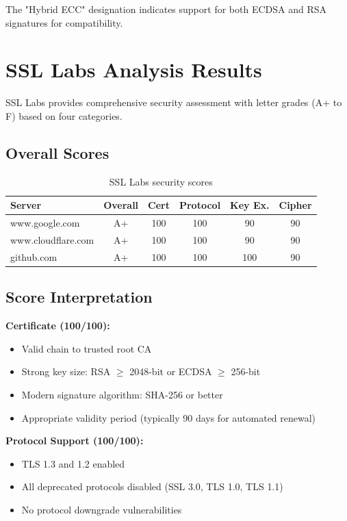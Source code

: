 \documentclass[12pt,a4paper]{article}
\begin{document}
The "Hybrid ECC" designation indicates support for both ECDSA and RSA signatures for compatibility.

\section{SSL Labs Analysis Results}

SSL Labs provides comprehensive security assessment with letter grades (A+ to F) based on four categories.

\subsection{Overall Scores}

\begin{table}[H]
\centering
\begin{tabular}{@{}lccccc@{}}
\toprule
\textbf{Server} & \textbf{Overall} & \textbf{Cert} & \textbf{Protocol} & \textbf{Key Ex.} & \textbf{Cipher} \\ \midrule
www.google.com & A+ & 100 & 100 & 90 & 90 \\
www.cloudflare.com & A+ & 100 & 100 & 90 & 90 \\
github.com & A+ & 100 & 100 & 100 & 90 \\
\bottomrule
\end{tabular}
\caption{SSL Labs security scores}
\end{table}

\subsection{Score Interpretation}

\textbf{Certificate (100/100):}
\begin{itemize}
    \item Valid chain to trusted root CA
    \item Strong key size: RSA $\geq$ 2048-bit or ECDSA $\geq$ 256-bit
    \item Modern signature algorithm: SHA-256 or better
    \item Appropriate validity period (typically 90 days for automated renewal)
\end{itemize}

\textbf{Protocol Support (100/100):}
\begin{itemize}
    \item TLS 1.3 and 1.2 enabled
    \item All deprecated protocols disabled (SSL 3.0, TLS 1.0, TLS 1.1)
    \item No protocol downgrade vulnerabilities
\end{itemize}
\end{document}

